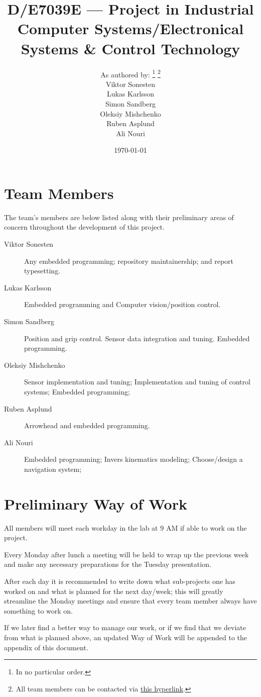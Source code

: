 \documentclass[twocolumn]{article}
\title{D/E7039E --- Project in Industrial Computer Systems/Electronical Systems \& Control Technology}
\author{
As authored by:
\footnote{In no particular order.}
\footnote{All team members can be contacted via
\href{mailto:vikson-6@student.ltu.se;lukkar-4@student.ltu.se;simpen-1@student.ltu.se;olemis-6@student.ltu.se;rubasp-6@student.ltu.se;alinou-6@student.ltu.se}{this hyperlink}.} \\
Viktor Sonesten \hypermail{vikson-6@student.ltu.se} \\
Lukas Karlsson \hypermail{lukkar-4@student.ltu.se} \\
Simon Sandberg \hypermail{simpen-1@student.ltu.se} \\
Oleksiy Mishchenko \hypermail{olemis-6@student.ltu.se} \\
Ruben Asplund \hypermail{rubasp-6@student.ltu.se} \\
Ali Nouri \hypermail{alinou-6@student.ltu.se}
}
\date{\today}
\begin{document}
\maketitle

\appendix
\section{Team Members}
The team's members are below listed along with their preliminary areas of concern throughout the development of this project.

\begin{description}
    \item[Viktor Sonesten]
    Any embedded programming;
    repository maintainership; and
    report typesetting.

    \item[Lukas Karlsson]
    Embedded programming and
    Computer vision/position control.
    \item[Simon Sandberg]
    Position and grip control.
    Sensor data integration and tuning.
    Embedded programming.
    \item[Oleksiy Mishchenko]
    Sensor implementation and tuning;
    Implementation and tuning of control systems;
    Embedded programming;
    \item[Ruben Asplund]
    Arrowhead and embedded programming.
    \item[Ali Nouri]
    Embedded programming;
    Invers kinematics modeling;
    Choose/design a navigation system;
\end{description}

\section{Preliminary Way of Work}
All members will meet each workday in the lab at 9 AM if able to work on the project.

Every Monday after lunch a meeting will be held to wrap up the previous week and make any necessary preparations for the Tuesday presentation.

After each day it is recommended to write down what sub-projects one has worked on and what is planned for the next day/week;
this will greatly streamline the Monday meetings and ensure that every team member always have something to work on.

If we later find a better way to manage our work,
or if we find that we deviate from what is planned above,
an updated Way of Work will be appended to the appendix of this document.
\end{document}
